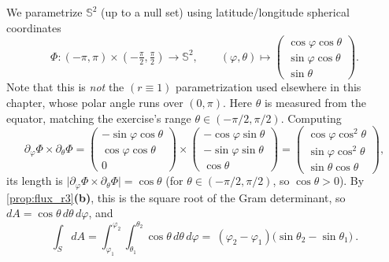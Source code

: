 \begin{exercisesolution}
\label{sol:spherical_quadrilateral_area}
We parametrize $\mathbb{S}^2$ (up to a null set) using latitude/longitude spherical
coordinates
\[\Phi : (-\pi,\pi)\times\left(-\tfrac\pi2,\tfrac\pi2\right) \to \mathbb{S}^2, \qquad
  (\varphi,\theta) \mapsto \begin{pmatrix}\cos\varphi\cos\theta\\ \sin\varphi\cos\theta\\
  \sin\theta\end{pmatrix}.\]
Note that this is \emph{not} the $(r\equiv1)$ parametrization used elsewhere in this chapter,
whose polar angle runs over $(0,\pi)$. Here $\theta$ is measured from the equator, matching
the exercise's range $\theta\in(-\pi/2,\pi/2)$. Computing
\[\partial_\varphi\Phi\times\partial_\theta\Phi = \begin{pmatrix}-\sin\varphi\cos\theta\\
  \cos\varphi\cos\theta\\ 0\end{pmatrix} \times \begin{pmatrix}-\cos\varphi\sin\theta\\
  -\sin\varphi\sin\theta\\ \cos\theta\end{pmatrix} = \begin{pmatrix}\cos\varphi\cos^2\theta\\
  \sin\varphi\cos^2\theta\\ \sin\theta\cos\theta\end{pmatrix},\]
its length is $\lvert\partial_\varphi\Phi\times\partial_\theta\Phi\rvert = \cos\theta$ (for
$\theta\in(-\pi/2,\pi/2)$, so $\cos\theta>0$). By \cref{prop:flux_r3}\textbf{(b)}, this is the
square root of the Gram determinant, so $dA = \cos\theta\,d\theta\,d\varphi$, and
\[\int_S dA = \int_{\varphi_1}^{\varphi_2}\!\!\int_{\theta_1}^{\theta_2} \cos\theta\,d\theta\,
  d\varphi = \boxed{\ (\varphi_2-\varphi_1)\big(\sin\theta_2-\sin\theta_1\big)\ }.\]
\end{exercisesolution}

